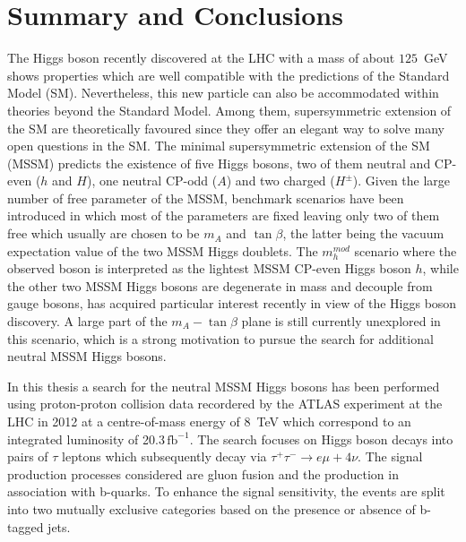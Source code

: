 \chapter{Summary and Conclusions}\label{chap:conclusion}
The  Higgs boson recently discovered  at the LHC 
with a mass of about $125$~GeV shows properties which are well compatible with the  predictions of
the Standard Model (SM). Nevertheless, this new particle can also
be accommodated within theories beyond the Standard Model. Among  them, 
supersymmetric extension of the SM are  theoretically favoured 
since they offer an elegant way to solve many open questions in the SM.
The minimal supersymmetric extension of the SM (MSSM) predicts the existence
of five Higgs bosons, two of them neutral and CP-even ($h$ and $H$), one neutral CP-odd ($A$) and two charged ($H^{\pm}$).
Given the large number of free parameter of the MSSM, 
benchmark scenarios have been introduced in which  most of the 
parameters are fixed leaving only two of them free which usually are chosen to be $m_A$ and $\tan\beta$,
the latter being the vacuum expectation value of the two MSSM Higgs doublets.
The $m_h^{mod}$ scenario where the observed boson is interpreted as 
the lightest MSSM CP-even Higgs boson $h$, while the other two MSSM Higgs bosons are  degenerate in mass
and decouple from gauge bosons, has acquired particular interest recently
in view of the Higgs boson discovery. 
A large part of the $m_A - \tan\beta$ plane is still currently         
unexplored  in this scenario, which is a strong motivation to pursue 
the search for additional neutral MSSM Higgs bosons.


In this thesis a search for the neutral MSSM Higgs bosons has been performed using proton-proton collision data
recordered by the ATLAS experiment at the LHC in 2012 at a centre-of-mass energy
of 8~TeV which correspond to an integrated luminosity of 20.3$\,\text{fb}^{-1}$. The search focuses on  Higgs boson decays
into pairs of $\tau$ leptons which subsequently decay via  $\tau^+ \tau^- \rightarrow e \mu +4\nu$.
The signal production processes considered are gluon fusion and the production in association with b-quarks. To enhance the signal 
sensitivity,  the  events are split into two mutually exclusive categories based on the presence
or absence of b-tagged jets.
 

